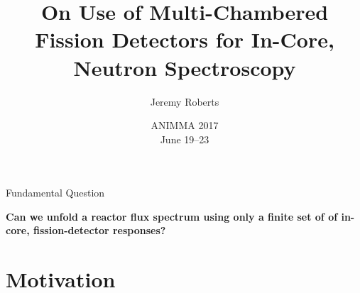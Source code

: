 \documentclass[fleqn]{beamer}
\title[In-Core Neutron Spectroscopy]{
    On Use of Multi-Chambered Fission Detectors for In-Core, Neutron Spectroscopy}
\author[J. Roberts]{
    Jeremy Roberts}
\institute[Kansas State University]{
    Assistant Professor \\
    Mechanical and Nuclear Engineering \\
    Kansas State University}
\date[ANIMMA 2017]{
    ANIMMA 2017 \\
    June 19--23}
\begin{document}
    \newcommand{\beginbackup}{
        \newcounter{framenumbervorappendix}
        \setcounter{framenumbervorappendix}{\value{framenumber}}
    }
    \newcommand{\backupend}{
        \addtocounter{framenumbervorappendix}{-\value{framenumber}}
        \addtocounter{framenumber}{\value{framenumbervorappendix}} 
    }
    
    \begin{frame}
        \titlepage
    \end{frame}
    
    \begin{frame}{Fundamental Question}
       \begin{center}
         {\bf\Large Can we unfold a reactor flux spectrum using only a 
         finite set of of in-core, fission-detector responses?}
       \end{center}
    \end{frame}
    
    \section{Motivation}
    
\end{document}
